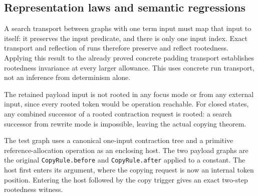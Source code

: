 


\subsection{Representation laws and semantic regressions}

A search transport between graphs with one term input must map that input
to itself: it preserves the input predicate, and there is only one input
index. Exact transport and reflection of runs therefore preserve and reflect
rootedness. Applying this result to the already proved concrete padding
transport establishes rootedness invariance at every larger allowance. This
uses concrete run transport, not an inference from determinism alone.




The retained payload input is not rooted in any focus mode or from any
external input, since every rooted token would be operation reachable. For
closed states, any combined successor of a rooted contraction request is
rooted: a search successor from rewrite mode is impossible, leaving the
actual copying theorem.



The test graph uses a canonical one-input contraction tree and a primitive
reference-allocation operation as an enclosing host. The two payload graphs
are the original \texttt{CopyRule.before} and \texttt{CopyRule.after} applied
to a constant. The host first enters its argument, where the copying request
is now an internal token position. Entering the host followed by the copy
trigger gives an exact two-step rootedness witness.



